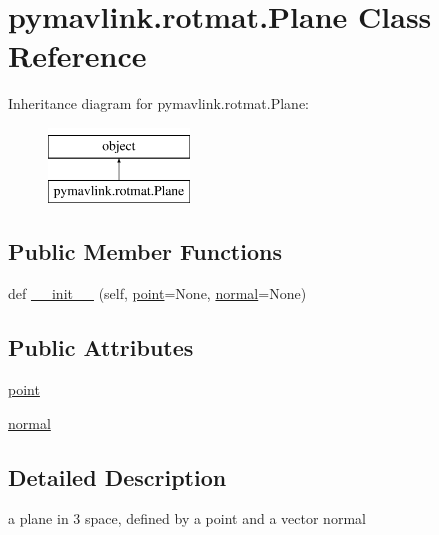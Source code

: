 \hypertarget{classpymavlink_1_1rotmat_1_1Plane}{}\section{pymavlink.\+rotmat.\+Plane Class Reference}
\label{classpymavlink_1_1rotmat_1_1Plane}
Inheritance diagram for pymavlink.\+rotmat.\+Plane\+:\begin{figure}[H]
\begin{center}
\leavevmode
\includegraphics[height=2.000000cm]{classpymavlink_1_1rotmat_1_1Plane}
\end{center}
\end{figure}
\subsection*{Public Member Functions}
\begin{DoxyCompactItemize}
\item 
def \mbox{\hyperlink{classpymavlink_1_1rotmat_1_1Plane_abb7f1250507e4cc5416009975337e80e}{\+\_\+\+\_\+init\+\_\+\+\_\+}} (self, \mbox{\hyperlink{classpymavlink_1_1rotmat_1_1Plane_aecbe2c0258b7dfa90fe10651aa4b33c1}{point}}=None, \mbox{\hyperlink{classpymavlink_1_1rotmat_1_1Plane_ad5fafc28ce87e911182fd5f4cf8f53d1}{normal}}=None)
\end{DoxyCompactItemize}
\subsection*{Public Attributes}
\begin{DoxyCompactItemize}
\item 
\mbox{\hyperlink{classpymavlink_1_1rotmat_1_1Plane_aecbe2c0258b7dfa90fe10651aa4b33c1}{point}}
\item 
\mbox{\hyperlink{classpymavlink_1_1rotmat_1_1Plane_ad5fafc28ce87e911182fd5f4cf8f53d1}{normal}}
\end{DoxyCompactItemize}


\subsection{Detailed Description}
\begin{DoxyVerb}a plane in 3 space, defined by a point and a vector normal\end{DoxyVerb}
 


